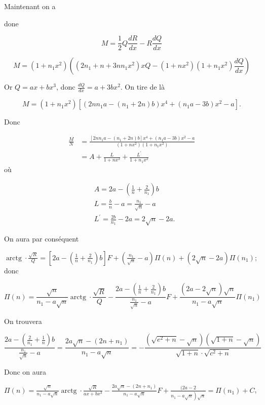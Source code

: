 \documentclass{article}
\begin{document}
Maintenant on a

done

\[
M=\frac{1}{2} Q \frac{d R}{d x}-R \frac{d Q}{d x}
\]

\[
M=\left(1+n_{1} x^{2}\right)\left(\left(2 n_{1}+n+3 n n_{1} x^{2}\right) x Q-\left(1+n x^{2}\right)\left(1+n_{1} x^{2}\right) \frac{d Q}{d x}\right)
\]

Or \(Q=a x+b x^{3}\), donc \(\frac{d Q}{d x}=a+3 b x^{2}\). On tire de là

\[
M=\left(1+n_{1} x^{2}\right)\left[\left(2 n n_{1} a-\left(n_{1}+2 n\right) b\right) x^{4}+\left(n_{1} a-3 b\right) x^{2}-a\right] .
\]

Donc

\[
\begin{aligned}
\frac{M}{N} & =\frac{\left[2 n n_{1} a-\left(n_{1}+2 n\right) b\right] x^{4}+\left(n_{1} a-3 b\right) x^{2}-a}{\left(1+n x^{2}\right)\left(1+n_{1} x^{2}\right)} \\
& =A+\frac{L}{1+n x^{2}}+\frac{L^{\prime}}{1+n_{1} x^{2}}
\end{aligned}
\]
où

\[
\begin{aligned}
& A=2 a-\left(\frac{1}{n}+\frac{2}{n_{1}}\right) b \\
& L=\frac{b}{n}-a=\frac{n_{1}}{\sqrt{n}}-a \\
& L^{\prime}=\frac{2 b}{n_{1}}-2 a=2 \sqrt{n}-2 a .
\end{aligned}
\]

On aura par conséquent

\(\operatorname{arctg} \cdot \frac{\sqrt{R}}{Q}=\left[2 a-\left(\frac{1}{n}+\frac{2}{n_{1}}\right) b\right] F+\left(\frac{n_{1}}{\sqrt{n}}-a\right) \Pi(n)+(2 \sqrt{n}-2 a) \Pi\left(n_{1}\right) ;\) donc

\[
\Pi(n)=\frac{\sqrt{n}}{n_{1}-a \sqrt{n}} \operatorname{arctg} \cdot \frac{\sqrt{R}}{Q}-\frac{2 a-\left(\frac{1}{n}+\frac{2}{n_{1}}\right) b}{\frac{n_{1}}{\sqrt{n}}-a} F+\frac{(2 a-2 \sqrt{n}) \sqrt{n}}{n_{1}-a \sqrt{n}} \Pi\left(n_{1}\right)
\]

On trouvera

\[
\frac{2 a-\left(\frac{2}{n_{1}}+\frac{1}{n}\right) b}{\frac{n_{1}}{\sqrt{n}}-a}=\frac{2 a \sqrt{n}-\left(2 n+n_{1}\right)}{n_{1}-a \sqrt{n}}=-\frac{\left(\sqrt{e^{2}+n}-\sqrt{n}\right)(\sqrt{1+n}-\sqrt{n})}{\sqrt{1+n} \cdot \sqrt{c^{2}+n}}
\]

Donc on aura

\(\Pi(n)=\frac{\sqrt{n}}{n_{1}-a \sqrt{n}} \operatorname{arctg} \cdot \frac{\sqrt{R}}{a x+b x^{3}}-\frac{2 a \sqrt{n}-\left(2 n+n_{1}\right)}{n_{1}-a \sqrt{n}} F+\frac{(2 a-2}{\left.n_{1}-a \sqrt{n}\right) \sqrt{n}}=\Pi\left(n_{1}\right)+C\),
\end{document}
